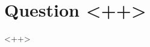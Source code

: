 \documentclass{article}
\title{\textbf{\metatitle{}}}
\date{\metadate{}}
\author{\metaauthor{} \\
	\href{mailto:\metaemail{}}{\small \textit{\metaemail{}}}}
\begin{document}
\maketitle

\section*{Question <++>}
<++>
\end{document}
